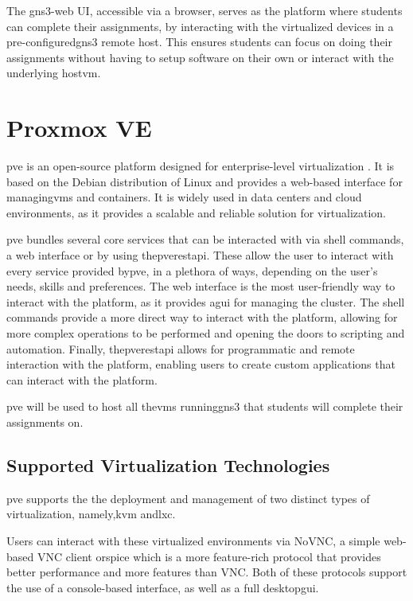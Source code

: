     The gns3-web UI, accessible via a browser, serves as the platform where students can complete their assignments, by interacting 
    with the virtualized devices in a pre-configured\ac{gns3} remote host. This ensures students can focus on doing their assignments without having 
    to setup software on their own or interact with the underlying host\ac{vm}.


\section{Proxmox VE}
\label{sec:chap2_pve}
  \ac{pve} is an open-source platform designed for enterprise-level virtualization \cite{proxmox2025}. It is based on the Debian
  distribution of Linux and provides a web-based interface for managing\ac{vm}s and containers. It is widely used
  in data centers and cloud environments, as it provides a scalable and reliable solution for virtualization.

  \ac{pve} bundles several core services that can be interacted with via shell commands, a web interface or by using
  the\ac{pve}\ac{rest}\ac{api}.
  These allow the user to interact with every service provided by\ac{pve}, in a plethora of ways, depending on the user's
  needs, skills and preferences. The web interface is the most user-friendly way to interact with the platform, as it
  provides a\ac{gui} for managing the cluster. The shell commands provide a more direct way to interact with the
  platform, allowing for more complex operations to be performed and opening the doors to scripting and automation. Finally,
  the\ac{pve}\ac{rest}\ac{api} allows for programmatic and remote interaction with the platform, enabling users to create custom
  applications that can interact with the platform.

  \ac{pve} will be used to host all the\ac{vm}s running\ac{gns3} that students will complete their assignments on.

  \subsection{Supported Virtualization Technologies}
    \ac{pve} supports the the deployment and management of two distinct types of virtualization, namely,\ac{kvm} and\ac{lxc}.

    Users can interact with these virtualized environments via NoVNC, a simple web-based VNC client or\ac{spice} which is a more
    feature-rich protocol that provides better performance and more features than VNC.
    Both of these protocols support the use of a console-based interface, as well as a full desktop\ac{gui}.

